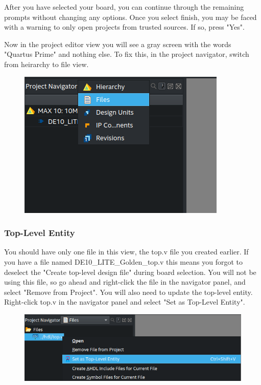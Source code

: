 \documentclass[12pt]{journal}
\begin{document}
After you have selected your board, you can continue through the remaining prompts without changing any options. Once you select finish, you may be faced with a warning to only open projects from trusted sources. If so, press "Yes".

Now in the project editor view you will see a gray screen with the words "Quartus Prime" and nothing else. To fix this, in the project navigator, switch from heirarchy to file view.

\begin{figure}[H]
    \centering
    \includegraphics[width=0.5\linewidth]{project_nav.png}
\end{figure}

\subsubsection{Top-Level Entity}

You should have only one file in this view, the top.v file you created earlier. If you have a file named DE10\_LITE\_Golden\_top.v this means you forgot to deselect the "Create top-level design file" during board selection. You will not be using this file, so go ahead and right-click the file in the navigator panel, and select "Remove from Project". You will also need to update the top-level entity. Right-click top.v in the navigator panel and select "Set as Top-Level Entity".

\begin{figure}[H]
    \centering
    \includegraphics[width=\linewidth]{toplevel.png}
\end{figure}
\end{document}
